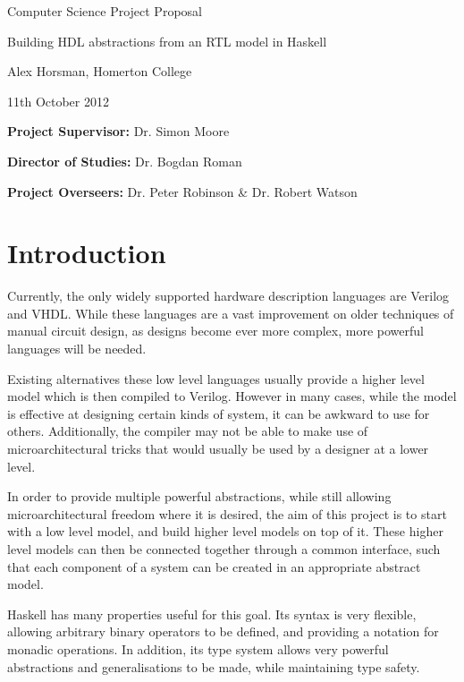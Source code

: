 


\vfil

\centerline{\Large Computer Science Project Proposal}
\vspace{0.4in}
\centerline{\Large Building HDL abstractions from an RTL 
model in Haskell}
\vspace{0.4in}
\centerline{\large Alex Horsman, Homerton College}
\vspace{0.3in}
\centerline{\large 11th October 2012}

\vfil


\noindent
{\bf Project Supervisor:} Dr. Simon Moore
\vspace{0.2in}

\noindent
{\bf Director of Studies:} Dr. Bogdan Roman
\vspace{0.2in}
\noindent
 
\noindent
{\bf Project Overseers:}
Dr. Peter Robinson \& Dr. Robert Watson

\vfil

\section*{Introduction}

Currently, the only widely supported hardware description 
languages are Verilog and VHDL. While these languages are a 
vast improvement on older techniques of manual circuit 
design, as designs become ever more complex, more powerful 
languages will be needed.

Existing alternatives these low level languages usually 
provide a higher level model which is then compiled to 
Verilog.  However in many cases, while the model is 
effective at designing certain kinds of system, it can be 
awkward to use for others.  Additionally, the compiler may 
not be able to make use of microarchitectural tricks that 
would usually be used by a designer at a lower level.

In order to provide multiple powerful abstractions, while 
still allowing microarchitectural freedom where it is 
desired, the aim of this project is to start with a low 
level model, and build higher level models on top of it.  
These higher level models can then be connected together 
through a common interface, such that each component of a 
system can be created in an appropriate abstract model.

Haskell has many properties useful for this goal. Its syntax 
is very flexible, allowing arbitrary binary operators to be 
defined, and providing a notation for monadic operations. In 
addition, its type system allows very powerful abstractions 
and generalisations to be made, while maintaining type 
safety.


